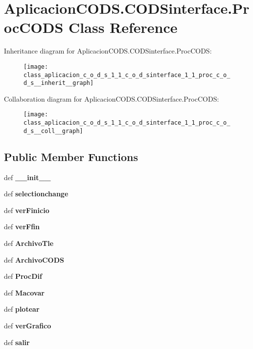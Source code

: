 \section{\-Aplicacion\-C\-O\-D\-S.\-C\-O\-D\-Sinterface.\-Proc\-C\-O\-D\-S \-Class \-Reference}
\label{class_aplicacion_c_o_d_s_1_1_c_o_d_sinterface_1_1_proc_c_o_d_s}


\-Inheritance diagram for \-Aplicacion\-C\-O\-D\-S.\-C\-O\-D\-Sinterface.\-Proc\-C\-O\-D\-S\-:\nopagebreak
\begin{figure}[H]
\begin{center}
\leavevmode
\texttt{[image: class\_aplicacion\_c\_o\_d\_s\_1\_1\_c\_o\_d\_sinterface\_1\_1\_proc\_c\_o\_d\_s\_\_inherit\_\_graph]}
\end{center}
\end{figure}


\-Collaboration diagram for \-Aplicacion\-C\-O\-D\-S.\-C\-O\-D\-Sinterface.\-Proc\-C\-O\-D\-S\-:\nopagebreak
\begin{figure}[H]
\begin{center}
\leavevmode
\texttt{[image: class\_aplicacion\_c\_o\_d\_s\_1\_1\_c\_o\_d\_sinterface\_1\_1\_proc\_c\_o\_d\_s\_\_coll\_\_graph]}
\end{center}
\end{figure}
\subsection*{\-Public \-Member \-Functions}
\begin{DoxyCompactItemize}
\item 
def {\bf \-\_\-\-\_\-init\-\_\-\-\_\-}
\item 
def {\bf selectionchange}
\item 
def {\bf ver\-Finicio}
\item 
def {\bf ver\-Ffin}
\item 
def {\bf \-Archivo\-Tle}
\item 
def {\bf \-Archivo\-C\-O\-D\-S}
\item 
def {\bf \-Proc\-Dif}
\item 
def {\bf \-Macovar}
\item 
def {\bf plotear}
\item 
def {\bf ver\-Grafico}
\item 
def {\bf salir}
\end{DoxyCompactItemize}
